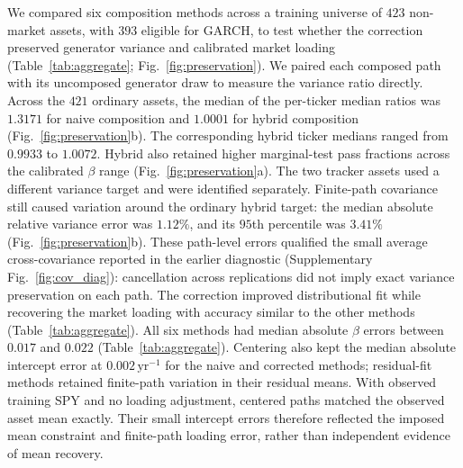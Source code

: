 We compared six composition methods across a training universe of
$423$ non-market assets, with $393$ eligible for GARCH, to test
whether the correction preserved generator variance and
calibrated market loading (Table~\ref{tab:aggregate};
Fig.~\ref{fig:preservation}). We paired each composed path with its
uncomposed generator draw to measure the variance ratio directly.
Across the $421$ ordinary assets, the median of the per-ticker
median ratios was $1.3171$ for naive composition and $1.0001$ for
hybrid composition (Fig.~\ref{fig:preservation}b). The corresponding
hybrid ticker medians ranged from $0.9933$ to $1.0072$. Hybrid also
retained higher marginal-test pass fractions across the calibrated
$\beta$ range (Fig.~\ref{fig:preservation}a). The two tracker assets
used a different variance target and were identified separately.
Finite-path covariance still caused variation around the ordinary
hybrid target: the median absolute relative variance error was
$1.12\%$, and its $95$th percentile was $3.41\%$
(Fig.~\ref{fig:preservation}b). These path-level errors qualified the
small average cross-covariance reported in the earlier diagnostic
(Supplementary Fig.~\ref{fig:cov_diag}): cancellation across replications did not imply
exact variance preservation on each path.
The correction improved distributional fit while recovering the
market loading with accuracy similar to the other methods
(Table~\ref{tab:aggregate}).
All six methods had median absolute $\beta$ errors between $0.017$
and $0.022$ (Table~\ref{tab:aggregate}). Centering also kept the
median absolute intercept error at $0.002\,\mathrm{yr}^{-1}$ for
the naive and corrected methods; residual-fit methods retained
finite-path variation in their residual means. With observed training
SPY and no loading adjustment, centered paths matched the observed
asset mean exactly. Their small intercept errors therefore reflected
the imposed mean constraint and finite-path loading error, rather
than independent evidence of mean recovery.

